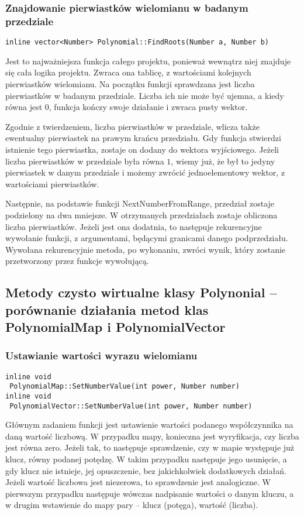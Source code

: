\subsubsection{Znajdowanie pierwiastków wielomianu w badanym przedziale}
\begin{lstlisting}
inline vector<Number> Polynomial::FindRoots(Number a, Number b)
\end{lstlisting}

Jest to najważniejsza funkcja całego projektu, ponieważ wewnątrz niej znajduje się cała logika projektu. Zwraca ona tablicę, z wartościami kolejnych pierwiastków wielomianu. Na początku funkcji sprawdzana jest liczba pierwiastków w badanym przedziale. Liczba ich nie może być ujemna, a kiedy równa jest $0$, funkcja kończy swoje działanie i zwraca pusty wektor.

Zgodnie z twierdzeniem, liczba pierwiastków w przedziale, wlicza także ewentualny pierwiastek na prawym krańcu przedziału. Gdy funkcja stwierdzi istnienie tego pierwiastka, zostaje on dodany do wektora wyjściowego. Jeżeli liczba pierwiastków w przedziale była równa $1$, wiemy już, że był to jedyny pierwiastek w danym przedziale i możemy zwrócić jednoelementowy wektor, z wartościami pierwiastków.

Następnie, na podstawie funkcji NextNumberFromRange, przedział zostaje podzielony na dwa mniejsze. W otrzymanych przedziałach zostaje obliczona liczba pierwiastków. Jeżeli jest ona dodatnia, to następuje rekurencyjne wywołanie funkcji, z argumentami, będącymi granicami danego podprzedziału. Wywołana rekurencyjnie metoda, po wykonaniu, zwróci wynik, który zostanie przetworzony przez funkcje wywołującą. 

\subsection{Metody czysto wirtualne klasy Polynonial – porównanie działania metod klas PolynomialMap i PolynomialVector}

\subsubsection{Ustawianie wartości wyrazu wielomianu}
\begin{lstlisting}
inline void
 PolynomialMap::SetNumberValue(int power, Number number)
inline void
 PolynomialVector::SetNumberValue(int power, Number number)
\end{lstlisting}

Głównym zadaniem funkcji jest ustawienie wartości podanego współczynnika na daną wartość liczbową. W przypadku mapy, konieczna jest wyryfikacja, czy liczba jest równa zero. Jeżeli tak, to następuje sprawdzenie, czy w mapie występuje już klucz, równy podanej potędzę. W takim przypadku następuje jego usunięcie, a gdy klucz nie istnieje, jej opuszczenie, bez jakichkolwiek dodatkowych działań. Jeżeli wartość liczbowa jest niezerowa, to sprawdzenie jest analogiczne. W pierwszym przypadku następuje wówczas nadpisanie wartości o danym kluczu, a w drugim wstawienie do mapy pary – klucz (potęga), wartość (liczba).

